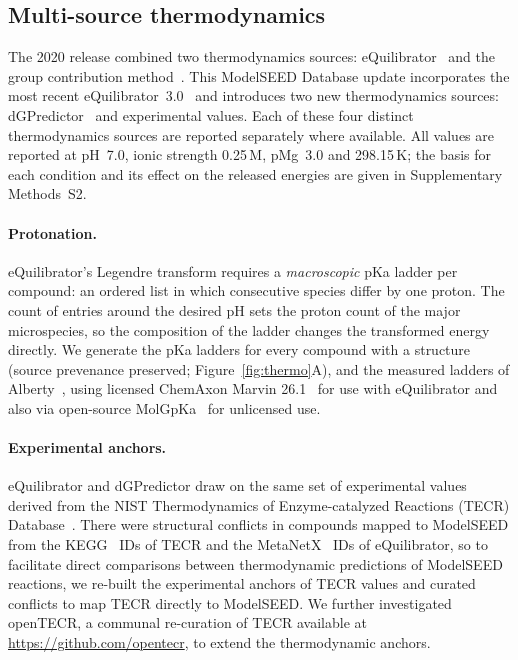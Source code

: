 \documentclass[unnumsec,webpdf,modern,large]{oup-authoring-template}
\begin{document}
\subsection{Multi-source thermodynamics}\label{sec:methods-thermo}

The 2020 release combined two thermodynamics sources: eQuilibrator~\cite{flamholz2012} and the group contribution method~\cite{jankowski2008}.
This ModelSEED Database update incorporates the most recent eQuilibrator~3.0~\cite{beber2022} and introduces two new thermodynamics sources: dGPredictor~\cite{wang2021} and experimental values.
Each of these four distinct thermodynamics sources are reported separately where available.
All values are reported at pH~7.0, ionic strength 0.25\,M, pMg~3.0 and 298.15\,K; the basis for each condition and its effect on the released energies are given in Supplementary Methods~S2.

\paragraph{Protonation.} eQuilibrator's Legendre transform requires a \emph{macroscopic} pKa ladder per compound: an ordered list in which consecutive species differ by one proton.
The count of entries around the desired pH sets the proton count of the major microspecies, so the composition of the ladder changes the transformed energy directly.
We generate the pKa ladders for every compound with a structure (source prevenance preserved; Figure~\ref{fig:thermo}A), and the measured ladders of Alberty~\cite{alberty2003}, using licensed ChemAxon Marvin 26.1~\cite{marvin} for use with eQuilibrator and also via open-source MolGpKa~\cite{pan2021} for unlicensed use. 

\paragraph{Experimental anchors.} eQuilibrator and dGPredictor draw on the same set of experimental values derived from the NIST Thermodynamics of Enzyme-catalyzed Reactions (TECR) Database~\cite{goldberg2004}.
There were structural conflicts in compounds mapped to ModelSEED from the KEGG~\cite{kanehisa2023} IDs of TECR and the MetaNetX~\cite{moretti2021} IDs of eQuilibrator, so to facilitate direct comparisons between thermodynamic predictions of ModelSEED reactions, we re-built the experimental anchors of TECR values and curated conflicts to map TECR directly to ModelSEED.
We further investigated openTECR, a communal re-curation of TECR available at \url{https://github.com/opentecr}, to extend the thermodynamic anchors.
\end{document}
